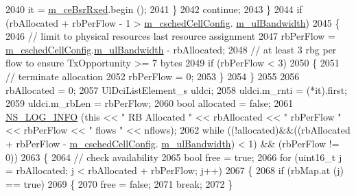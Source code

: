 \begin{DoxyCode}
2040               it = \hyperlink{classns3_1_1CqaFfMacScheduler_ae2ec92c28a8adb7f5d63d658fd1e3949}{m\_ceBsrRxed}.begin ();
2041             \}
2042           \textcolor{keywordflow}{continue};
2043         \}
2044       \textcolor{keywordflow}{if} (rbAllocated + rbPerFlow - 1 > \hyperlink{classns3_1_1CqaFfMacScheduler_ad5dc768ca3a3c71671fd64de7de8ec00}{m\_cschedCellConfig}.
      \hyperlink{structns3_1_1FfMacCschedSapProvider_1_1CschedCellConfigReqParameters_a5ab5b102878e6e7e7727a14af4a64d2f}{m\_ulBandwidth})
2045         \{
2046           \textcolor{comment}{// limit to physical resources last resource assignment}
2047           rbPerFlow = \hyperlink{classns3_1_1CqaFfMacScheduler_ad5dc768ca3a3c71671fd64de7de8ec00}{m\_cschedCellConfig}.\hyperlink{structns3_1_1FfMacCschedSapProvider_1_1CschedCellConfigReqParameters_a5ab5b102878e6e7e7727a14af4a64d2f}{m\_ulBandwidth} - rbAllocated;
2048           \textcolor{comment}{// at least 3 rbg per flow to ensure TxOpportunity >= 7 bytes}
2049           \textcolor{keywordflow}{if} (rbPerFlow < 3)
2050             \{
2051               \textcolor{comment}{// terminate allocation}
2052               rbPerFlow = 0;
2053             \}
2054         \}
2055 
2056       rbAllocated = 0;
2057       UlDciListElement\_s uldci;
2058       uldci.m\_rnti = (*it).first;
2059       uldci.m\_rbLen = rbPerFlow;
2060       \textcolor{keywordtype}{bool} allocated = \textcolor{keyword}{false};
2061       \hyperlink{group__logging_gafbd73ee2cf9f26b319f49086d8e860fb}{NS\_LOG\_INFO} (\textcolor{keyword}{this} << \textcolor{stringliteral}{" RB Allocated "} << rbAllocated << \textcolor{stringliteral}{" rbPerFlow "} << rbPerFlow << \textcolor{stringliteral}{"
       flows "} << nflows);
2062       \textcolor{keywordflow}{while} ((!allocated)&&((rbAllocated + rbPerFlow - \hyperlink{classns3_1_1CqaFfMacScheduler_ad5dc768ca3a3c71671fd64de7de8ec00}{m\_cschedCellConfig}.
      \hyperlink{structns3_1_1FfMacCschedSapProvider_1_1CschedCellConfigReqParameters_a5ab5b102878e6e7e7727a14af4a64d2f}{m\_ulBandwidth}) < 1) && (rbPerFlow != 0))
2063         \{
2064           \textcolor{comment}{// check availability}
2065           \textcolor{keywordtype}{bool} free = \textcolor{keyword}{true};
2066           \textcolor{keywordflow}{for} (uint16\_t j = rbAllocated; j < rbAllocated + rbPerFlow; j++)
2067             \{
2068               \textcolor{keywordflow}{if} (rbMap.at (j) == \textcolor{keyword}{true})
2069                 \{
2070                   free = \textcolor{keyword}{false};
2071                   \textcolor{keywordflow}{break};
2072                 \}

\end{DoxyCode}
